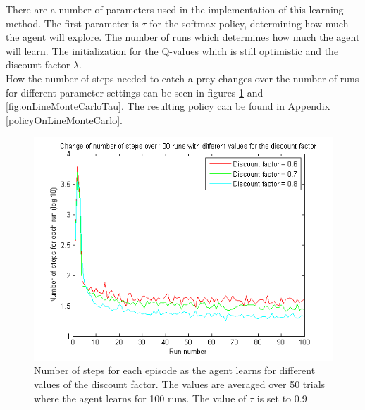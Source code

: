 \documentclass{article}
\begin{document}
There are a number of parameters used in the implementation of this learning method. The first parameter is $\tau$ for the softmax policy, determining how much the agent will explore. The number of runs which determines how much the agent will learn. The initialization for the Q-values which is still optimistic and the discount factor $\lambda$.\\  

How the number of steps needed to catch a prey changes over the number of runs for different parameter settings can be seen in figures \ref{fig:onLineMonteCarloDiscount} and \ref{fig:onLineMonteCarloTau}. The resulting policy can be found in Appendix \ref{policyOnLineMonteCarlo}.

\begin{figure}
\centering
\caption{Number of steps for each episode as the agent learns for different values of the discount factor. The values are averaged over 50 trials where the agent learns for 100 runs. The value of $\tau$ is set to 0.9}
\label{fig:onLineMonteCarloDiscount}
\includegraphics[scale=0.8]{averagesInOneFig_online_discountFact.png}
\end{figure}
\end{document}
